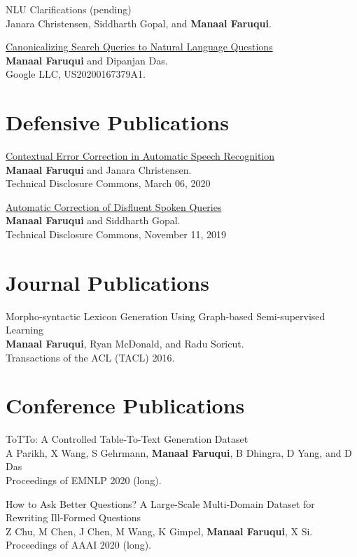 \documentclass[margin,line]{res}
\begin{document}
\begin{resume}
NLU Clarifications (pending)\\
Janara Christensen, Siddharth Gopal, and \textbf{Manaal Faruqui}.

\href{https://patents.google.com/patent/US20200167379A1/en}{Canonicalizing Search Queries to Natural Language Questions}\\
\textbf{Manaal Faruqui} and Dipanjan Das.\\
Google LLC, US20200167379A1.

\section{\sc Defensive Publications}
\href{https://www.tdcommons.org/dpubs_series/2989/}{Contextual Error Correction in Automatic Speech Recognition}\\
\textbf{Manaal Faruqui} and Janara Christensen.\\
Technical Disclosure Commons, March 06, 2020

\href{https://www.tdcommons.org/dpubs_series/2661/}{Automatic Correction of Disfluent Spoken Queries}\\
\textbf{Manaal Faruqui} and Siddharth Gopal.\\
Technical Disclosure Commons, November 11, 2019

\section{\sc Journal Publications}

Morpho-syntactic Lexicon Generation Using Graph-based Semi-supervised Learning\\
\textbf{Manaal Faruqui}, Ryan McDonald, and Radu Soricut.\\
Transactions of the ACL (TACL) 2016.

\vspace{.2cm}
\section{\sc Conference Publications}

ToTTo: A Controlled Table-To-Text Generation Dataset\\
A Parikh, X Wang, S Gehrmann, \textbf{Manaal Faruqui}, B Dhingra, D Yang, and D Das\\
Proceedings of EMNLP 2020 (long).

How to Ask Better Questions? A Large-Scale Multi-Domain Dataset for Rewriting Ill-Formed Questions\\
Z Chu, M Chen, J Chen, M Wang, K Gimpel, \textbf{Manaal Faruqui}, X Si.\\
Proceedings of AAAI 2020 (long).


\end{resume}
\end{document}
